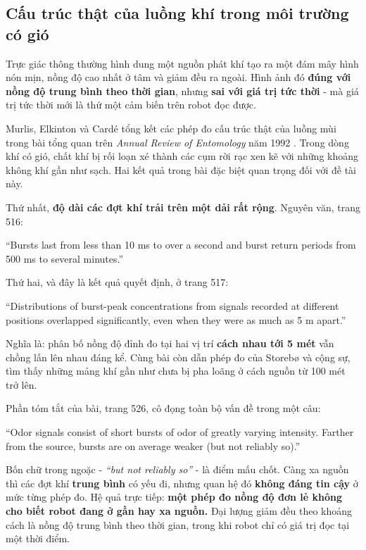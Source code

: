 \subsection{Cấu trúc thật của luồng khí trong môi trường có gió}
Trực giác thông thường hình dung một nguồn phát khí tạo ra một đám mây hình nón mịn, nồng độ cao nhất ở tâm và giảm đều ra ngoài. Hình ảnh đó \textbf{đúng với nồng độ trung bình theo thời gian}, nhưng \textbf{sai với giá trị tức thời} - mà giá trị tức thời mới là thứ một cảm biến trên robot đọc được.

Murlis, Elkinton và Cardé tổng kết các phép đo cấu trúc thật của luồng mùi trong bài tổng quan trên \textit{Annual Review of Entomology} năm 1992 \cite{r1}. Trong dòng khí có gió, chất khí bị rối loạn xé thành các cụm rời rạc xen kẽ với những khoảng không khí gần như sạch. Hai kết quả trong bài đặc biệt quan trọng đối với đề tài này.

Thứ nhất, \textbf{độ dài các đợt khí trải trên một dải rất rộng}. Nguyên văn, trang 516:

\begin{trichdan}
``Bursts last from less than 10 ms to over a second and burst return periods from 500 ms to several minutes.''
\end{trichdan}
Thứ hai, và đây là kết quả quyết định, ở trang 517:

\begin{trichdan}
``Distributions of burst-peak concentrations from signals recorded at different positions overlapped significantly, even when they were as much as 5 m apart.''
\end{trichdan}
Nghĩa là: phân bố nồng độ đỉnh đo tại hai vị trí \textbf{cách nhau tới 5 mét} vẫn chồng lấn lên nhau đáng kể. Cùng bài còn dẫn phép đo của Storebø và cộng sự, tìm thấy những mảng khí gần như chưa bị pha loãng ở cách nguồn từ 100 mét trở lên.

Phần tóm tắt của bài, trang 526, cô đọng toàn bộ vấn đề trong một câu:

\begin{trichdan}
``Odor signals consist of short bursts of odor of greatly varying intensity. Farther from the source, bursts are on average weaker (but not reliably so).''
\end{trichdan}
Bốn chữ trong ngoặc - \textit{``but not reliably so''} - là điểm mấu chốt. Càng xa nguồn thì các đợt khí \textbf{trung bình} có yếu đi, nhưng quan hệ đó \textbf{không đáng tin cậy} ở mức từng phép đo. Hệ quả trực tiếp: \textbf{một phép đo nồng độ đơn lẻ không cho biết robot đang ở gần hay xa nguồn.} Đại lượng giảm đều theo khoảng cách là nồng độ trung bình theo thời gian, trong khi robot chỉ có giá trị đọc tại một thời điểm.

